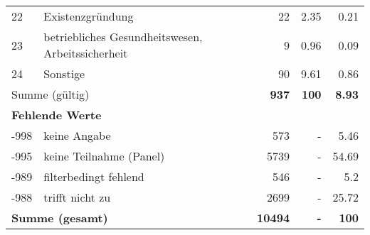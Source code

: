 \begin{longtable}{lXrrr}
        22 & \multicolumn{1}{X}{Existenzgründung} & %
          \num{22} &
          \num[round-mode=places,round-precision=2]{2.35} &
          \num[round-mode=places,round-precision=2]{0.21} \\

        23 & \multicolumn{1}{X}{betriebliches Gesundheitswesen, Arbeitssicherheit} & %
          \num{9} &
          \num[round-mode=places,round-precision=2]{0.96} &
          \num[round-mode=places,round-precision=2]{0.09} \\

        24 & \multicolumn{1}{X}{Sonstige} & %
          \num{90} &
          \num[round-mode=places,round-precision=2]{9.61} &
          \num[round-mode=places,round-precision=2]{0.86} \\

     \midrule
     \multicolumn{2}{l}{Summe (gültig)} &
       \textbf{\num{937}} &
     \textbf{\num{100}} &
       \textbf{\num[round-mode=places,round-precision=2]{8.93}} \\
     \multicolumn{5}{l}{\textbf{Fehlende Werte}}\\
       -998 &
       keine Angabe &
         \num{573} &
        - &
         \num[round-mode=places,round-precision=2]{5.46} \\
       -995 &
       keine Teilnahme (Panel) &
         \num{5739} &
        - &
         \num[round-mode=places,round-precision=2]{54.69} \\
       -989 &
       filterbedingt fehlend &
         \num{546} &
        - &
         \num[round-mode=places,round-precision=2]{5.2} \\
       -988 &
       trifft nicht zu &
         \num{2699} &
        - &
         \num[round-mode=places,round-precision=2]{25.72} \\
     \midrule
     \multicolumn{2}{l}{\textbf{Summe (gesamt)}} &
          \textbf{\num{10494}} &
        \textbf{-} &
        \textbf{\num{100}} \\
     \bottomrule
     \end{longtable}
     

